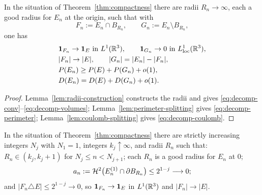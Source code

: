 \begin{theorem}[Decomposition]\label{thm:decomposition}
In the situation of Theorem~\ref{thm:compactness} there are radii
$R_n\to\infty$, each a good radius for $E_n$ at the origin, such that with
\[
  F_n:=E_n\cap B_{R_n},\qquad G_n:=E_n\setminus B_{R_n},
\]
one has
\begin{align}
  &\mathbf 1_{F_n}\to\mathbf 1_{E}\ \text{in }L^1(\mathbb R^3),
   \qquad \mathbf 1_{G_n}\to0\ \text{in }L^1_{\mathrm{loc}}(\mathbb R^3),
   \label{eq:decomp-conv}\\
  &|F_n|\to|E|,\qquad |G_n|=|E_n|-|F_n|,
   \label{eq:decomp-volumes}\\
  &P(E_n)\ge P(E)+P(G_n)+o(1),
   \label{eq:decomp-perimeter}\\
  &D(E_n)=D(E)+D(G_n)+o(1).
   \label{eq:decomp-coulomb}
\end{align}
\end{theorem}

\begin{proof}
Lemma~\ref{lem:radii-construction} constructs the radii and gives
\eqref{eq:decomp-conv}--\eqref{eq:decomp-volumes};
Lemma~\ref{lem:perimeter-splitting} gives \eqref{eq:decomp-perimeter};
Lemma~\ref{lem:coulomb-splitting} gives \eqref{eq:decomp-coulomb}.
\end{proof}

\begin{lemma}\label{lem:radii-construction}
In the situation of Theorem~\ref{thm:compactness} there are strictly
increasing integers $N_j$ with $N_1=1$, integers $k_j\uparrow\infty$, and
radii $R_n$ such that: $R_n\in(k_j,k_j+1)$ for $N_j\le n<N_{j+1}$; each $R_n$
is a good radius for $E_n$ at $0$;
\begin{equation}\label{eq:radii-an}
  a_n:=\mathcal H^2\bigl(E_n^{(1)}\cap\partial B_{R_n}\bigr)\le2^{1-j}
  \longrightarrow0;
\end{equation}
and $|F_n\triangle E|\le2^{1-j}\to0$, so
$\mathbf 1_{F_n}\to\mathbf 1_{E}$ in $L^1(\mathbb R^3)$ and $|F_n|\to|E|$.
\end{lemma}

